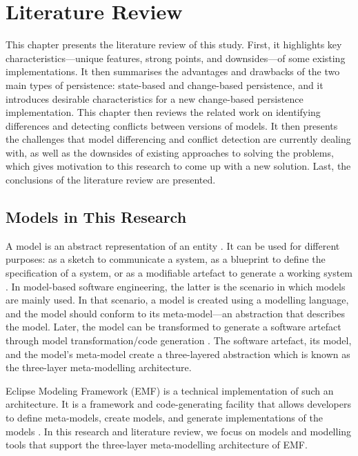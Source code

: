 \chapter{Literature Review}
\label{ch:literature_review}

This chapter presents the literature review of this study. First, it highlights key characteristics—unique features, strong points, and downsides—of some existing implementations. It then summarises the advantages and drawbacks of the two main types of persistence: state-based and change-based persistence, and it introduces desirable characteristics for a new change-based persistence implementation. This chapter then reviews the related work on identifying differences and detecting conflicts between versions of models. It then presents the challenges that model differencing and conflict detection are currently dealing with, as well as the downsides of existing approaches to solving the problems, which gives motivation to this research to come up with a new solution. Last, the conclusions of the literature review are presented.

\section{Models in This Research}
\label{sec:models_in_this_research)}

A model is an abstract representation of an entity \cite{volter2013model}. It can be used for different purposes: as a sketch to communicate a system, as a blueprint to define the specification of a system, or as a modifiable artefact to generate a working system \cite{fowler2019umlmode}. In model-based software engineering, the latter is the scenario in which models are mainly used.
In that scenario, a model is created using a modelling language, and the model should conform to its meta-model—an abstraction that describes the model. Later, the model can be transformed to generate a software artefact through model transformation/code generation \cite{brambilla2012model}. The software artefact, its model, and the model’s meta-model create a three-layered abstraction which is known as the three-layer meta-modelling architecture.

Eclipse Modeling Framework (EMF) \cite{steinberg2008emf} is a technical implementation of such an architecture. It is a framework and code-generating facility that allows developers to define meta-models, create models, and generate implementations of the models \cite{steinberg2008emf}. In this research and literature review, we focus on models and modelling tools that support the three-layer meta-modelling architecture of EMF.

